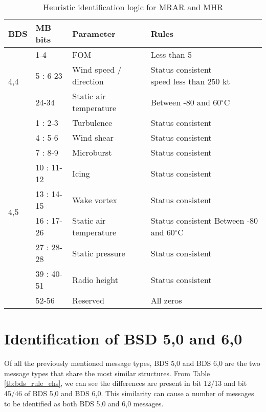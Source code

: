 \begin{table}
\footnotesize
\centering
\small
\caption{Heuristic identification logic for MRAR and MHR}
\label{tb:bds_rule_mrar}
\begin{tabular}{|l|l|l|l|}
\hline
\textbf{BDS} & \textbf{MB bits} & \textbf{Parameter} & \textbf{Rules} \\ \hline \hline
\multirow{3}{*}{4,4} & 1-4 & FOM & Less than 5 \\ \cline{2-4} 
& 5 : 6-23 & Wind speed / direction & \makecell*{Status consistent \\ speed less than 250 kt} \\ \cline{2-4} 
& 24-34 & Static air temperature & Between -80 and 60$^\circ$C \\ \hline \hline
\multirow{9}{*}{4,5} & 1 : 2-3 & Turbulence & Status consistent \\ \cline{2-4} 
& 4 : 5-6 & Wind shear & Status consistent \\ \cline{2-4} 
& 7 : 8-9 & Microburst & Status consistent \\ \cline{2-4} 
& 10 : 11-12 & Icing & Status consistent \\ \cline{2-4} 
& 13 : 14-15 & Wake vortex & Status consistent \\ \cline{2-4} 
& 16 : 17-26 & Static air temperature & \makecell*{Status consistent \\ Between -80 and 60$^\circ$C} \\ \cline{2-4} 
& 27 : 28-28 & Static pressure & Status consistent \\ \cline{2-4} 
& 39 : 40-51 & Radio height & Status consistent \\ \cline{2-4} 
& 52-56 & Reserved & All zeros \\ \hline
\end{tabular}
\end{table}




\section{Identification of BSD 5,0 and 6,0}

Of all the previously mentioned message types, BDS 5,0 and BDS 6,0 are the two message types that share the most similar structures. From Table \ref{tb:bds_rule_ehs}, we can see the differences are present in bit 12/13 and bit 45/46 of BDS 5,0 and BDS 6,0. This similarity can cause a number of messages to be identified as both BDS 5,0 and 6,0 messages.


